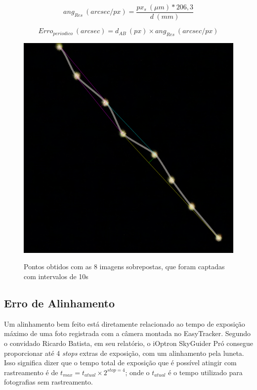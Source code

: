\begin{equation}
	ang_{Res}~(arcsec/px) = \dfrac{px_s~ (\mu m) * 206,3}{d~ (mm)}
	\label{eq:arc}
\end{equation}

\begin{equation}
	Erro_{periodico}~(arcsec) = d_{AB}~(px) \times ang_{Res} ~(arcsec/px)
	\label{eq:erroperiodic}
\end{equation}

\begin{figure}[htb]
	\centering
	\caption{Pontos obtidos com as 8 imagens sobrepostas, que foram captadas com intervalos de 10s}
	\includegraphics[width=.8\linewidth]{figuras/resultados/periodicErrorImage}
	\label{fig:periodicErrorImage}
\end{figure}


\subsection{Erro de Alinhamento}

Um alinhamento bem feito está diretamente relacionado ao tempo de exposição máximo de uma foto registrada com a câmera montada no EasyTracker. Segundo o convidado Ricardo Batista, em seu relatório, o iOptron SkyGuider Pró consegue proporcionar até 4 \textit{stops} extras de exposição, com um alinhamento pela luneta. Isso significa dizer que o tempo total de exposição que é possível atingir com rastreamento é de $ t_{max} = t_{atual} \times 2^{stop = 4} $; onde o $ t_{atual} $ é o tempo utilizado para fotografias sem rastreamento. 


